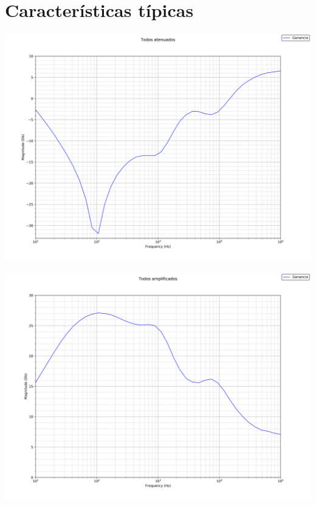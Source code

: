 \documentclass[a4paper,12pt,oneside,pdflatex,italian,final,twocolumn]{article}
\begin{document}
\section{Características típicas}
\begin{minipage}{0.47\textwidth}
  \includegraphics[width=\textwidth]{-B-M-A}
\end{minipage}
\hfill
\begin{minipage}{0.47\textwidth}
  \includegraphics[width=\textwidth]{+B+M+A}
\end{minipage}
\end{document}
